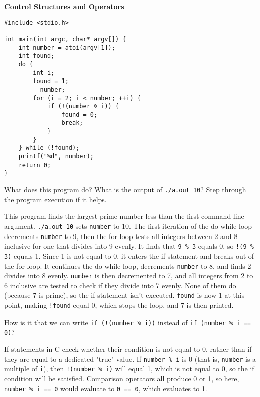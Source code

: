 \textbf{Control Structures and Operators}

\begin{verbatim}
#include <stdio.h>

int main(int argc, char* argv[]) {
    int number = atoi(argv[1]);
    int found;
    do {
        int i;
        found = 1;
        --number;
        for (i = 2; i < number; ++i) {
            if (!(number % i)) {
                found = 0;
                break;
            }
        }
    } while (!found);
    printf("%d", number);
    return 0;
}
\end{verbatim}



What does this program do? What is the output of \texttt{./a.out 10}? Step through the program execution if it helps.

\begin{answer}
This program finds the largest prime number less than the first command line argument. \texttt{./a.out 10} sets \texttt{number} to 10. The first iteration of the do-while loop decrements \texttt{number} to 9, then the for loop tests all integers between 2 and 8 inclusive for one that divides into 9 evenly. It finds that \texttt{9 \% 3} equals 0, so \texttt{!(9 \% 3)} equals 1. Since 1 is not equal to 0, it enters the if statement and breaks out of the for loop. It continues the do-while loop, decrements \texttt{number} to 8, and finds 2 divides into 8 evenly. \texttt{number} is then decremented to 7, and all integers from 2 to 6 inclusive are tested to check if they divide into 7 evenly. None of them do (because 7 is prime), so the if statement isn't executed. \texttt{found} is now 1 at this point, making \texttt{!found} equal 0, which stops the loop, and 7 is then printed.
\end{answer}



How is it that we can write \texttt{if (!(number \% i))} instead of \texttt{if (number \% i == 0)}?

\begin{answer}
If statements in C check whether their condition is not equal to 0, rather than if they are equal to a dedicated "true" value. If \texttt{number \% i} is 0 (that is, \texttt{number} is a multiple of \texttt{i}), then \texttt{!(number \% i)} will equal 1, which is not equal to 0, so the if condition will be satisfied. Comparison operators all produce 0 or 1, so here, \texttt{number \% i == 0} would evaluate to \texttt{0 == 0}, which evaluates to 1.
\end{answer}



